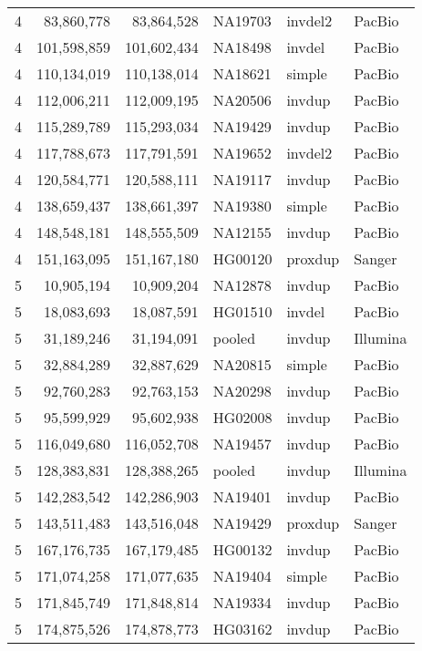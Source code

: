 {\begin{tiny}
\begin{longtable}{rrrlll}
    4   & 83,860,778  & 83,864,528  & NA19703 & invdel2 & PacBio  \\
    4   & 101,598,859 & 101,602,434 & NA18498 & invdel  & PacBio  \\
    4   & 110,134,019 & 110,138,014 & NA18621 & simple  & PacBio  \\
    4   & 112,006,211 & 112,009,195 & NA20506 & invdup  & PacBio  \\
    4   & 115,289,789 & 115,293,034 & NA19429 & invdup  & PacBio  \\
    4   & 117,788,673 & 117,791,591 & NA19652 & invdel2 & PacBio  \\
    4   & 120,584,771 & 120,588,111 & NA19117 & invdup  & PacBio  \\
    4   & 138,659,437 & 138,661,397 & NA19380 & simple  & PacBio  \\
    4   & 148,548,181 & 148,555,509 & NA12155 & invdup  & PacBio  \\
    4   & 151,163,095 & 151,167,180 & HG00120 & proxdup & Sanger  \\
    5   & 10,905,194  & 10,909,204  & NA12878 & invdup  & PacBio  \\
    5   & 18,083,693  & 18,087,591  & HG01510 & invdel  & PacBio  \\
    5   & 31,189,246  & 31,194,091  & pooled  & invdup  & Illumina  \\
    5   & 32,884,289  & 32,887,629  & NA20815 & simple  & PacBio  \\
    5   & 92,760,283  & 92,763,153  & NA20298 & invdup  & PacBio  \\
    5   & 95,599,929  & 95,602,938  & HG02008 & invdup  & PacBio  \\
    5   & 116,049,680 & 116,052,708 & NA19457 & invdup  & PacBio  \\
    5   & 128,383,831 & 128,388,265 & pooled  & invdup  & Illumina  \\
    5   & 142,283,542 & 142,286,903 & NA19401 & invdup  & PacBio  \\
    5   & 143,511,483 & 143,516,048 & NA19429 & proxdup & Sanger  \\
    5   & 167,176,735 & 167,179,485 & HG00132 & invdup  & PacBio  \\
    5   & 171,074,258 & 171,077,635 & NA19404 & simple  & PacBio  \\
    5   & 171,845,749 & 171,848,814 & NA19334 & invdup  & PacBio  \\
    5   & 174,875,526 & 174,878,773 & HG03162 & invdup  & PacBio  \\

\end{longtable}
\end{tiny}}
